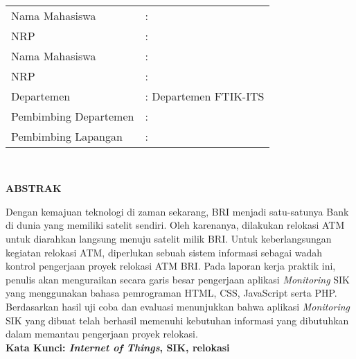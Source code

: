 \thispagestyle{plain}
\begin{centering}
	\textbf{\MakeUppercase{\judul}}
\end{centering} \\[20pt]
\begin{tabular}{ll}
	Nama Mahasiswa  &: \MakeUppercase{\namaPenulisSatu} \\
	NRP &: \nrpPenulisSatu \\
	Nama Mahasiswa  & : \MakeUppercase{\namaPenulisDua} \\
	NRP &: \nrpPenulisDua \\
	Departemen  &: Departemen \departemen FTIK-ITS \\
	Pembimbing Departemen  &: \pembimbingDept \\
	Pembimbing Lapangan  &: \pembimbingLap
\end{tabular} \\[10pt]
\begin{center}
	\textbf{ABSTRAK}
\end{center}
\indent\indent Dengan kemajuan teknologi di zaman sekarang, BRI menjadi satu-satunya Bank di dunia yang memiliki satelit sendiri. Oleh karenanya, dilakukan relokasi ATM untuk diarahkan langsung menuju satelit milik BRI. Untuk keberlangsungan kegiatan relokasi ATM, diperlukan sebuah sistem informasi sebagai wadah kontrol pengerjaan proyek relokasi ATM BRI.
\indent Pada laporan kerja praktik ini, penulis akan menguraikan secara garis besar pengerjaan aplikasi \textit{Monitoring} SIK yang menggunakan bahasa pemrograman HTML, CSS, JavaScript serta PHP.\\
\indent Berdasarkan hasil uji coba dan evaluasi menunjukkan bahwa aplikasi \textit{Monitoring} SIK yang dibuat telah berhasil memenuhi kebutuhan informasi yang dibutuhkan dalam memantau pengerjaan proyek relokasi. \\[10pt]
\textbf{Kata Kunci: \textit{Internet of Things}, SIK, relokasi}


\cleardoublepage
